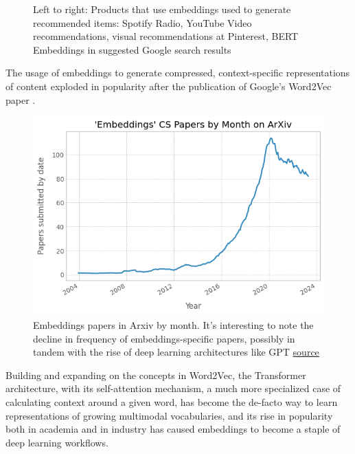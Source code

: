 \documentclass[11pt, table]{diazessay} %
\begin{document}
\begin{sloppypar}
\begin{figure}[H]
\caption{Left to right: Products that use embeddings used to generate recommended items: Spotify Radio, YouTube Video recommendations, visual recommendations at Pinterest, BERT Embeddings in suggested Google search results}
\end{figure}

The usage of embeddings to generate compressed, context-specific representations of content exploded in popularity after the publication of Google’s Word2Vec paper  \citep{mikolov2013efficient}.

\begin{figure}[H]
\centering
\includegraphics[width=.7\linewidth]{figures/embeddings_1.png}
\caption{Embeddings papers in Arxiv by month. It's interesting to note the decline in frequency of embeddings-specific papers, possibly in tandem with the rise of deep learning architectures like GPT \href{https://github.com/veekaybee/what_are_embeddings/blob/main/notebooks/fig_2_embeddings_papers.ipynb}{source}}
\end{figure}

Building and expanding on the concepts in Word2Vec, the Transformer  \citep{vaswani2017attention} architecture, with its self-attention mechanism, a much more specialized case of calculating context around a given word, has become the de-facto way to learn representations of growing multimodal vocabularies, and its rise in popularity both in academia and in industry has caused embeddings to become a staple of deep learning workflows.


\end{sloppypar}
\end{document}
